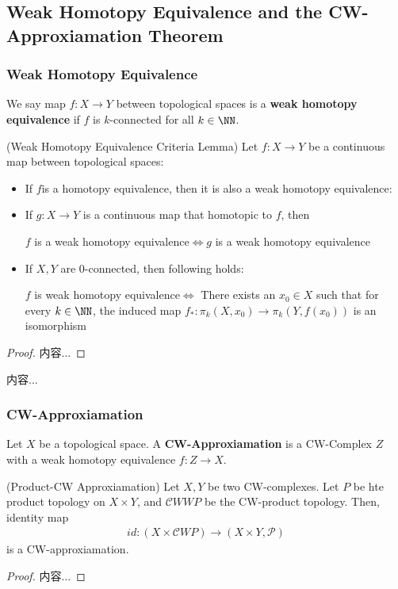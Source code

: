 \documentclass[Total.tex]{subfiles}
\begin{document}
	\subsection{Weak Homotopy Equivalence and the CW-Approxiamation Theorem}
	\subsubsection{Weak Homotopy Equivalence}
	\begin{Def}
		We say map $f:X\rightarrow Y$ between topological spaces is a \textbf{weak homotopy equivalence} if $f$ is $k$-connected for all $k\in \NN$.
	\end{Def}
	\begin{lemma}
		(Weak Homotopy Equivalence Criteria Lemma) Let $f:X\rightarrow Y$ be a continuous map between topological spaces:
		\begin{itemize}
			\item If $f$is a homotopy equivalence, then it is also a weak homotopy equivalence:
			\item If $g:X\rightarrow Y$ is a continuous map that homotopic to $f$, then
			\begin{center}
				$f$ is a weak homotopy equivalence$\Leftrightarrow g$ is a weak homotopy equivalence
			\end{center}
			\item If $X,Y$ are $0$-connected, then following holds:
			\begin{center}
				$f$ is weak homotopy equivalence$\Leftrightarrow$ There exists an $x_0\in X$ such that for every $k\in \NN$, the induced map $f_*:\pi_k(X,x_0)\rightarrow \pi_k(Y,f(x_0))$ is an isomorphism
			\end{center}
		\end{itemize}
	\end{lemma}
	\begin{proof}
		内容...
	\end{proof}
	\begin{proposition}
		内容...
	\end{proposition}
	\subsubsection{CW-Approxiamation}
	\begin{Def}
		Let $X$ be a topological space. A \textbf{CW-Approxiamation} is a CW-Complex $Z$ with a weak homotopy equivalence $f:Z\rightarrow X$.
	\end{Def}
	\begin{lemma}
		(Product-CW Approxiamation) Let $X,Y$ be two CW-complexes. Let $P$ be hte product topology on $X\times Y$, and ${\mathcal CWWP}$ be the CW-product topology. Then, identity map
		\begin{gather*}
			id:(X\times {\mathcal CWP})\rightarrow (X\times Y,\mathcal{P})
		\end{gather*}
		is a CW-approxiamation.
	\end{lemma}
	\begin{proof}
		内容...
	\end{proof}
	
\end{document}
